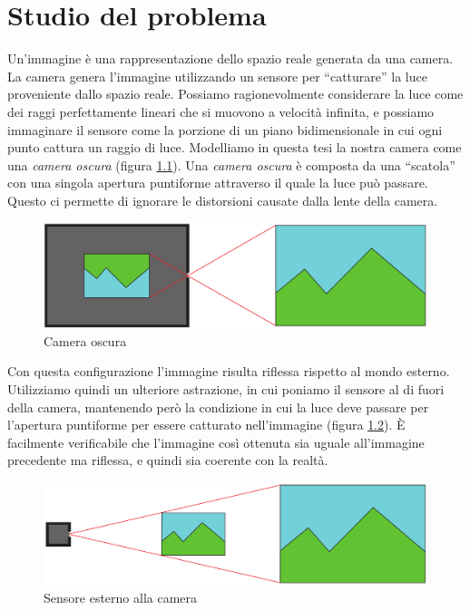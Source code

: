 \chapter{Studio del problema}
\label{sec:teoria}

Un'immagine è una rappresentazione dello spazio reale generata da una camera.
La camera genera l'immagine utilizzando un sensore per ``catturare'' la luce proveniente dallo spazio reale. 
Possiamo ragionevolmente considerare la luce come dei raggi perfettamente lineari che si muovono a velocità infinita, e possiamo immaginare il sensore come la porzione di un piano bidimensionale in cui ogni punto cattura un raggio di luce.
Modelliamo in questa tesi la nostra camera come una \emph{camera oscura} (figura \ref{fig:camera oscura}).
Una \emph{camera oscura} è composta da una ``scatola'' con una singola apertura puntiforme attraverso il quale la luce può passare.
Questo ci permette di ignorare le distorsioni causate dalla lente della camera.
\begin{figure}
    \caption{Camera oscura}
    \label{fig:camera oscura}
    \centering
    \includegraphics[width=\textwidth]{images/camera oscura.pdf}
\end{figure}

Con questa configurazione l'immagine risulta riflessa rispetto al mondo esterno.
Utilizziamo quindi un ulteriore astrazione, in cui poniamo il sensore al di fuori della camera, mantenendo però la condizione in cui la luce deve passare per l'apertura puntiforme per essere catturato nell'immagine (figura \ref{fig:camera model}).
È facilmente verificabile che l'immagine così ottenuta sia uguale all'immagine precedente ma riflessa, e quindi sia coerente con la realtà.
\begin{figure}
    \caption{Sensore esterno alla camera}
    \label{fig:camera model}
    \centering
    \includegraphics[width=\textwidth]{images/camera astratta.pdf}
\end{figure}

